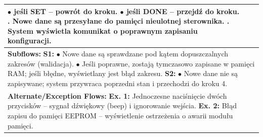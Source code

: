 \documentclass[12pt,a4paper]{article}
\begin{document}
\begin{table}[h!]
\begin{tabular}{|p{}|p{}|p{}|}
{\hspace*{10pt} $\bullet$ jeśli SET – powrót do kroku. \newline
\hspace*{10pt} $\bullet$ jeśli DONE – przejdź do kroku. \newline
5. Nowe dane są przesyłane do pamięci nieulotnej sterownika. \newline
6. System wyświetla komunikat o poprawnym zapisaniu konfiguracji.} \\ \hline
\multicolumn{3}{|p{0.9\textwidth}|}{\textbf{Subflows:} \newline
\textbf{S1:} \newline
\hspace*{10pt} $\bullet$ Nowe dane są sprawdzane pod kątem dopuszczalnych zakresów (walidacja). \newline
\hspace*{10pt} $\bullet$ Jeśli poprawne, zostają tymczasowo zapisane w pamięci RAM; jeśli błędne, wyświetlany jest błąd zakresu. \newline
\textbf{S2:} \newline
\hspace*{10pt} $\bullet$ Nowe dane nie są zapisywane; system przywraca poprzedni stan i przechodzi do kroku 4.} \\ \hline
\multicolumn{3}{|p{0.9\textwidth}|}{\textbf{Alternate/Exception Flows:} \newline
\textbf{Ex. 1:} Jednoczesne naciśnięcie dwóch przycisków – sygnał dźwiękowy (beep) i ignorowanie wejścia. \newline
\textbf{Ex. 2:} Błąd zapisu do pamięci EEPROM – wyświetlenie ostrzeżenia o awarii modułu pamięci.} \\ \hline
\end{tabular}
\end{table}

\newpage
\end{document}
